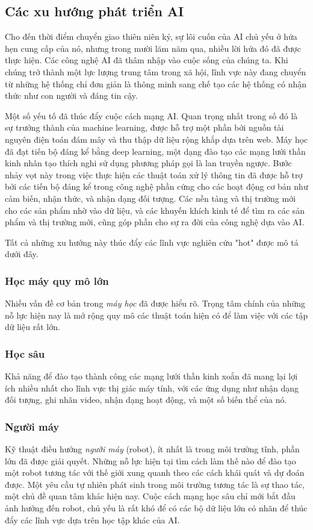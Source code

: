\subsection{Các xu hướng phát triển AI}
Cho đến thời điểm chuyển giao thiên niên kỷ, sự lôi cuốn của AI chủ yếu ở hứa hẹn cung cấp của nó, nhưng trong mười lăm năm qua, nhiều lời hứa đó đã được thực hiện. Các công nghệ AI đã thâm nhập vào cuộc sống của chúng ta. Khi chúng trở thành một lực lượng trung tâm trong xã hội, lĩnh vực này đang chuyển từ những hệ thống chỉ đơn giản là thông minh sang chế tạo các hệ thống có nhận thức như con người và đáng tin cậy.\par
Một số yếu tố đã thúc đẩy cuộc cách mạng AI. Quan trọng nhất trong số đó là sự trưởng thành của machine learning, được hỗ trợ một phần bởi nguồn tài nguyên điện toán đám mây và thu thập dữ liệu rộng khắp dựa trên web. Máy học đã đạt tiến bộ đáng kể bằng deep learning, một dạng đào tạo các mạng lưới thần kinh nhân tạo thích nghi sử dụng phương pháp gọi là lan truyền ngược. Bước nhảy vọt này trong việc thực hiện các thuật toán xử lý thông tin đã được hỗ trợ bởi các tiến bộ đáng kể trong công nghệ phần cứng cho các hoạt động cơ bản như cảm biến, nhận thức, và nhận dạng đối tượng. Các nền tảng và thị trường mới cho các sản phẩm nhờ vào dữ liệu, và các khuyến khích kinh tế để tìm ra các sản phẩm và thị trường mới, cũng góp phần cho sự ra đời của công nghệ dựa vào AI.\par
Tất cả những xu hướng này thúc đẩy các lĩnh vực nghiên cứu "hot" được mô tả dưới đây.\par
\subsubsection{Học máy quy mô lớn}
Nhiều vấn đề cơ bản trong \textit{máy học} đã được hiểu rõ. Trọng tâm chính của những nỗ lực hiện nay là mở rộng quy mô các thuật toán hiện có để làm việc với các tập dữ liệu rất lớn.
\subsubsection{Học sâu}
Khả năng để đào tạo thành công các mạng lưới thần kinh xoắn đã mang lại lợi ích nhiều nhất cho lĩnh vực thị giác máy tính, với các ứng dụng như nhận dạng đối tượng, ghi nhãn video, nhận dạng hoạt động, và một số biến thể của nó.
\subsubsection{Người máy}
Kỹ thuật điều hướng \textit{người máy} (robot), ít nhất là trong môi trường tĩnh, phần lớn đã được giải quyết. Những nỗ lực hiện tại tìm cách làm thế nào để đào tạo một robot tương tác với thế giới xung quanh theo các cách khái quát và dự đoán được. Một yêu cầu tự nhiên phát sinh trong môi trường tương tác là sự thao tác, một chủ đề quan tâm khác hiện nay. Cuộc cách mạng học sâu chỉ mới bắt đầu ảnh hưởng đến robot, chủ yếu là rất khó để có các bộ dữ liệu lớn có nhãn để thúc đẩy các lĩnh vực dựa trên học tập khác của AI.
